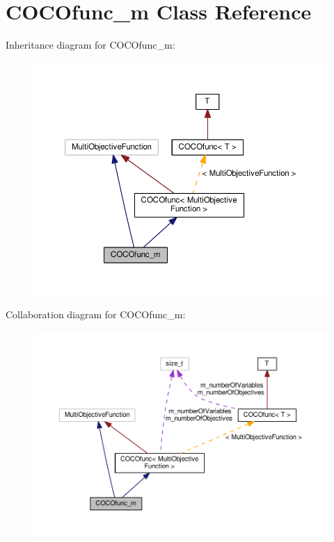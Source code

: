 \hypertarget{classCOCOfunc__m}{}\section{C\+O\+C\+Ofunc\+\_\+m Class Reference}
\label{classCOCOfunc__m}


Inheritance diagram for C\+O\+C\+Ofunc\+\_\+m\+:\nopagebreak
\begin{figure}[H]
\begin{center}
\leavevmode
\includegraphics[width=350pt]{classCOCOfunc__m__inherit__graph}
\end{center}
\end{figure}


Collaboration diagram for C\+O\+C\+Ofunc\+\_\+m\+:\nopagebreak
\begin{figure}[H]
\begin{center}
\leavevmode
\includegraphics[width=350pt]{classCOCOfunc__m__coll__graph}
\end{center}
\end{figure}
